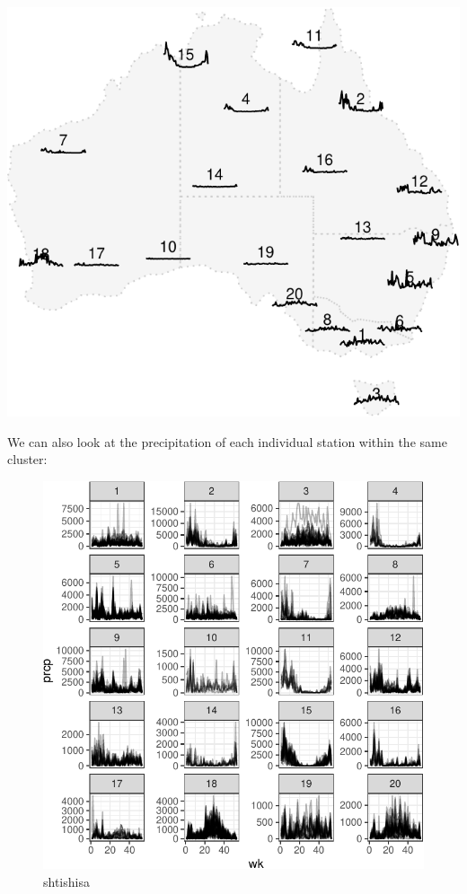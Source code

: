 \documentclass[
]{jss}
\begin{document}
\begin{CodeChunk}


\begin{center}\includegraphics{figures/unnamed-chunk-15-1} \end{center}

\end{CodeChunk}

We can also look at the precipitation of each individual station within
the same cluster:

\begin{CodeChunk}
\begin{figure}

{\centering \includegraphics{figures/unnamed-chunk-16-1} 

}

\caption[shtishisa]{shtishisa}\label{fig:unnamed-chunk-16}
\end{figure}
\end{CodeChunk}
\end{document}
